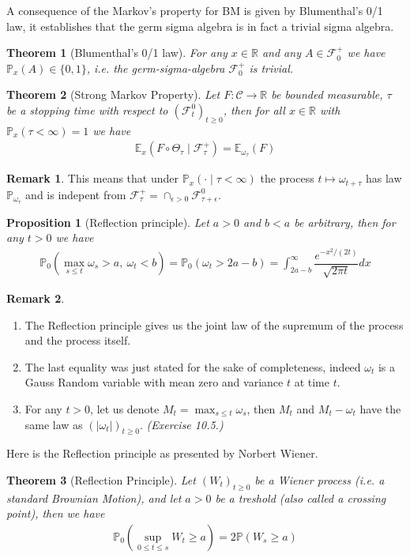 \documentclass[11pt,a4paper, final]{article}
\newtheorem{thm}{Theorem}[section]
\newtheorem{prop}{Proposition}[section]
\theoremstyle{definition}
\newtheorem{rem}{Remark}[section]
\begin{document}
\noindent A consequence of the Markov's property for BM is given by Blumenthal's 0/1 law, it establishes that the germ sigma algebra is in fact a trivial sigma algebra.
\begin{thm}[Blumenthal's 0/1 law] For any $x \in \mathbb{R}$ and any $A \in \mathcal{F}_0^+$ we have $\mathbb{P}_x(A) \in \lbrace 0,1 \rbrace$, i.e. the germ-sigma-algebra $\mathcal{F}_0^+$ is trivial. 
\end{thm}
\begin{thm}[Strong Markov Property] Let $F: \mathcal{C} \to \mathbb{R}$ be bounded measurable, $\tau$ be a stopping time with respect to $(\mathcal{F}_t^0)_{t \geq 0}$, then for all $x \in \mathbb{R}$ with $\mathbb{P}_x( \tau < \infty) =1$ we have 
\begin{align*}
\mathbb{E}_x( F \circ \Theta_\tau  \mid \mathcal{F}_\tau^+) = \mathbb{E}_{\omega_\tau} ( F)
\end{align*}
\end{thm}
\begin{rem} This means that under $\mathbb{P}_x(  \cdot \mid \tau < \infty)$ the process $t \mapsto \omega_{t + \tau}$ has law $\mathbb{P}_{ \omega_\tau}$ and is indepent from $\mathcal{F}_\tau^+ = \cap_{ \epsilon >0} \mathcal{F}_{\tau + \epsilon}^0$.
\end{rem}
\newpage
\begin{prop}[Reflection principle] Let $a>0$ and $b<a$ be arbitrary, then for any $t>0$ we have 
\begin{align*}
\mathbb{P}_0 \left( \max_{s \leq t} \omega_s >a, \ \omega_t < b \right) = \mathbb{P}_0( \omega_t > 2a-b) = \int_{2a-b}^\infty \dfrac{e^{-x^2/(2t)}}{\sqrt{2 \pi t}} dx 
\end{align*}
\end{prop}
\begin{rem} \
\begin{enumerate}
\item The Reflection principle gives us the joint law of the supremum of the process and the process itself. 
\item The last equality was just stated for the sake of completeness, indeed $\omega_t$ is a Gauss Random variable with mean zero and variance $t$ at time $t$. 
\item For any $t>0$, let us denote $M_t= \max_{s \leq t} \omega_s$, then $M_t$ and $M_t- \omega_t$ have the same law as $(|\omega_t|)_{t \geq 0}$. \textit{(Exercise 10.5.)}
\end{enumerate}
\end{rem}
\noindent Here is the Reflection principle as presented by Norbert Wiener.
\begin{thm}[Reflection Principle] Let $(W_t)_{t \geq 0}$ be a Wiener process (i.e. a standard Brownian Motion), and let $a>0$ be a treshold (also called a crossing point), then we have 
\begin{align*}
\mathbb{P}_0 \left( \sup_{0 \leq t \leq s } W_t \geq a \right) = 2 \mathbb{P}(  W_s \geq a)
\end{align*} 
\end{thm}
\end{document}

